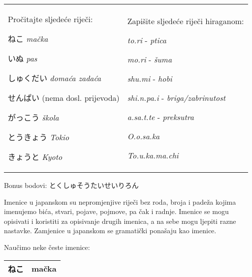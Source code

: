 	
	\begin{tabular}{p{200pt} p{200pt}}
		\begin{mondai}{Pročitajte sljedeće riječi:}
			\item ねこ \textit{mačka}
			\item いぬ \textit{pas}
			\item しゅくだい \textit{domaća zadaća}
			\item せんぱい (nema dosl. prijevoda)
			\item がっこう \textit{škola}
			\item とうきょう \textit{Tokio}
			\item きょうと \textit{Kyoto}
		\end{mondai}
		&
		\begin{mondai}{Zapišite sljedeće riječi hiraganom:}
			\item \textit{to.ri} - \textit{ptica}
			\item \textit{mo.ri} - \textit{šuma}
			\item \textit{shu.mi} - \textit{hobi}
			\item \textit{shi.n.pa.i} - \textit{briga/zabrinutost}
			\item \textit{a.sa.t.te} - \textit{preksutra}
			\item \textit{O.o.sa.ka}
			\item \textit{To.u.ka.ma.chi}
		\end{mondai}\\
	\end{tabular}
	
	Bonus bodovi: とくしゅそうたいせいりろん
	
\newpage
{}


	
	
	Imenice u japanskom su nepromjenjive riječi bez roda, broja i padeža kojima imenujemo bića, stvari, pojave, pojmove, pa čak i radnje. Imenice se mogu opisivati i koristiti za opisivanje drugih imenica, a na sebe mogu ljepiti razne nastavke. Zamjenice u japanskom se gramatički ponašaju kao imenice.

Naučimo neke česte imenice:
\vspace{10pt}

	\begin{tabular}{|l|l|}
		\hline
		ねこ&mačka\\\hline
	\end{tabular}
	\vspace{10pt}
	
